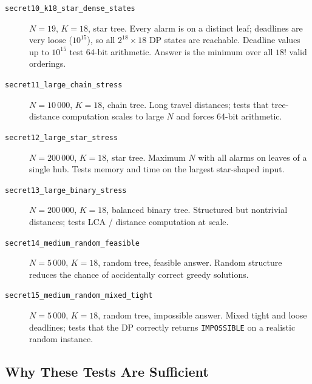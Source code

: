 \documentclass[11pt]{article}
\begin{document}
\begin{description}
  \item[\texttt{secret10\_k18\_star\_dense\_states}]
        $N=19$, $K=18$, star tree.  Every alarm is on a distinct leaf;
        deadlines are very loose ($10^{15}$), so all $2^{18}\times18$ DP
        states are reachable.  Deadline values up to $10^{15}$ test
        64-bit arithmetic.  Answer is the minimum over all $18!$ valid
        orderings.

  \item[\texttt{secret11\_large\_chain\_stress}]
        $N=10\,000$, $K=18$, chain tree.  Long travel distances; tests that
        tree-distance computation scales to large $N$ and forces 64-bit
        arithmetic.

  \item[\texttt{secret12\_large\_star\_stress}]
        $N=200\,000$, $K=18$, star tree.  Maximum $N$ with all alarms on
        leaves of a single hub.  Tests memory and time on the largest
        star-shaped input.

  \item[\texttt{secret13\_large\_binary\_stress}]
        $N=200\,000$, $K=18$, balanced binary tree.  Structured but
        nontrivial distances; tests LCA / distance computation at scale.

  \item[\texttt{secret14\_medium\_random\_feasible}]
        $N=5\,000$, $K=18$, random tree, feasible answer.
        Random structure reduces the chance of accidentally correct greedy
        solutions.

  \item[\texttt{secret15\_medium\_random\_mixed\_tight}]
        $N=5\,000$, $K=18$, random tree, impossible answer.
        Mixed tight and loose deadlines; tests that the DP correctly returns
        \texttt{IMPOSSIBLE} on a realistic random instance.
\end{description}

\subsection*{Why These Tests Are Sufficient}
\end{document}
